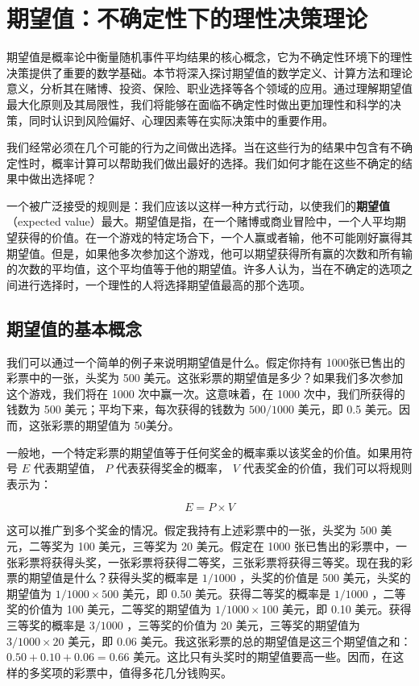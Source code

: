 \section{期望值：不确定性下的理性决策理论}

\begin{logicbox}[title=引言]
期望值是概率论中衡量随机事件平均结果的核心概念，它为不确定性环境下的理性决策提供了重要的数学基础。本节将深入探讨期望值的数学定义、计算方法和理论意义，分析其在赌博、投资、保险、职业选择等各个领域的应用。通过理解期望值最大化原则及其局限性，我们将能够在面临不确定性时做出更加理性和科学的决策，同时认识到风险偏好、心理因素等在实际决策中的重要作用。
\end{logicbox}

我们经常必须在几个可能的行为之间做出选择。当在这些行为的结果中包含有不确定性时，概率计算可以帮助我们做出最好的选择。我们如何才能在这些不确定的结果中做出选择呢？

一个被广泛接受的规则是：我们应该以这样一种方式行动，以使我们的\textbf{期望值}（expected value）最大。期望值是指，在一个赌博或商业冒险中，一个人平均期望获得的价值。在一个游戏的特定场合下，一个人赢或者输，他不可能刚好赢得其期望值。但是，如果他多次参加这个游戏，他可以期望获得所有赢的次数和所有输的次数的平均值，这个平均值等于他的期望值。许多人认为，当在不确定的选项之间进行选择时，一个理性的人将选择期望值最高的那个选项。

\subsection{期望值的基本概念}

我们可以通过一个简单的例子来说明期望值是什么。假定你持有 1000张已售出的彩票中的一张，头奖为 500 美元。这张彩票的期望值是多少？如果我们多次参加这个游戏，我们将在 1000 次中赢一次。这意味着，在 1000 次中，我们所获得的钱数为 500 美元；平均下来，每次获得的钱数为 $500 / 1000$ 美元，即 0.5 美元。因而，这张彩票的期望值为 50美分。

一般地，一个特定彩票的期望值等于任何奖金的概率乘以该奖金的价值。如果用符号 $E$ 代表期望值， $P$ 代表获得奖金的概率， $V$ 代表奖金的价值，我们可以将规则表示为：

$$
E=P \times V
$$

这可以推广到多个奖金的情况。假定我持有上述彩票中的一张，头奖为 500 美元，二等奖为 100 美元，三等奖为 20 美元。假定在 1000 张已售出的彩票中，一张彩票将获得头奖，一张彩票将获得二等奖，三张彩票将获得三等奖。现在我的彩票的期望值是什么？获得头奖的概率是 $1 / 1000$ ，头奖的价值是 500 美元，头奖的期望值为 $1 / 1000 \times 500$ 美元，即 0.50 美元。获得二等奖的概率是 $1 / 1000$ ，二等奖的价值为 100 美元，二等奖的期望值为 $1 / 1000 \times 100$ 美元，即 0.10 美元。获得三等奖的概率是 $3 / 1000$ ，三等奖的价值为 20 美元，三等奖的期望值为 $3 / 1000 \times 20$ 美元，即 0.06 美元。我这张彩票的总的期望值是这三个期望值之和： $0.50+0.10+0.06=0.66$ 美元。这比只有头奖时的期望值要高一些。因而，在这样的多奖项的彩票中，值得多花几分钱购买。

